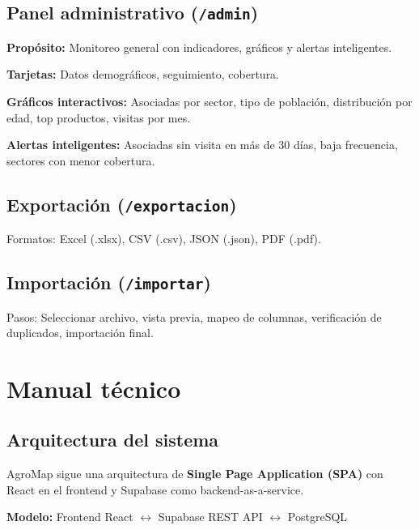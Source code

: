\documentclass[12pt]{article}
\begin{document}
\subsection{Panel administrativo (\texttt{/admin})}
\textbf{Prop\'osito:} Monitoreo general con indicadores, gr\'aficos y alertas inteligentes.

\textbf{Tarjetas:} Datos demogr\'aficos, seguimiento, cobertura.

\textbf{Gr\'aficos interactivos:} Asociadas por sector, tipo de poblaci\'on, distribuci\'on por edad, top productos, visitas por mes.

\textbf{Alertas inteligentes:} Asociadas sin visita en m\'as de 30 d\'ias, baja frecuencia, sectores con menor cobertura.

\subsection{Exportaci\'on (\texttt{/exportacion})}
Formatos: Excel (.xlsx), CSV (.csv), JSON (.json), PDF (.pdf).

\subsection{Importaci\'on (\texttt{/importar})}
Pasos: Seleccionar archivo, vista previa, mapeo de columnas, verificaci\'on de duplicados, importaci\'on final.

\section{Manual t\'ecnico}

\subsection{Arquitectura del sistema}
AgroMap sigue una arquitectura de \textbf{Single Page Application (SPA)} con React en el frontend y Supabase como backend-as-a-service.
\begin{center}
  \textbf{Modelo:} Frontend React $\leftrightarrow$ Supabase REST API $\leftrightarrow$ PostgreSQL
\end{center}
\end{document}
